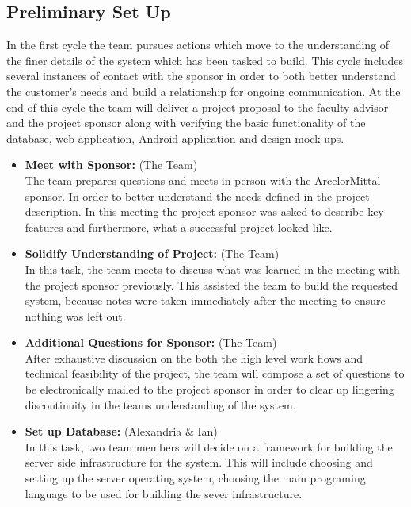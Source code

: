 \documentclass[Letter,11pt]{article}
\begin{document}
		
	\subsection{Preliminary Set Up}\label{cyc1}
		In the first cycle the team pursues actions which move to the understanding of the finer details of the system which has been tasked to build. This cycle includes several instances of contact with the sponsor in order to both better understand the customer's needs and build a relationship for ongoing communication. At the end of this cycle the team will deliver a project proposal to the faculty advisor and the project sponsor along with verifying the basic functionality of the database, web application, Android application and design mock-ups. 
		
		\begin{itemize}
			\item\textbf{Meet with Sponsor:} (The Team)\\
			The team prepares questions and meets in person with the ArcelorMittal sponsor. In order to better understand the needs defined in the project description. In this meeting the project sponsor was asked to describe key features and furthermore, what a successful project looked like.
			
			\item \textbf{Solidify Understanding of Project:} (The Team)\\
			In this task, the team meets to discuss what was learned in the meeting with the project sponsor previously. This assisted the team to build the requested system, because notes were taken immediately after the meeting to ensure nothing was left out. 
			
			\item\textbf{Additional Questions for Sponsor:} (The Team)\\
			After exhaustive discussion on the both the high level work flows and technical feasibility of the project, the team will compose a set of questions to be electronically mailed to the project sponsor in order to clear up lingering discontinuity in the teams understanding of the system.
			
			\item\textbf{Set up Database:} (Alexandria \& Ian)\\
			In this task,  two team members will decide on a framework for building the server side infrastructure for the system. This will include choosing and setting up the server operating system, choosing the main programing language to be used for building the sever infrastructure.
			

\end{itemize}
\end{document}
